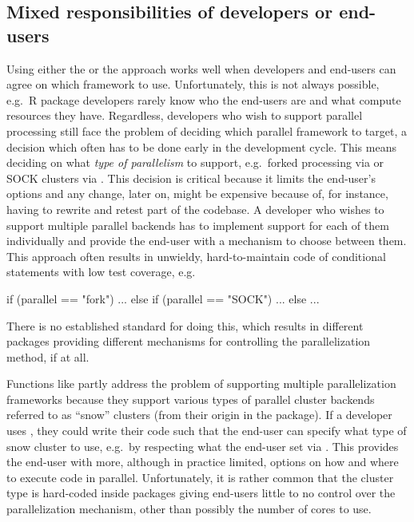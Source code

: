 \subsection{Mixed responsibilities of developers or end-users}
\label{mixed-responsibilities}

Using either the  or the  approach
works well when developers and end-users can agree on which framework
to use. Unfortunately, this is not always possible, e.g.\ R package
developers rarely know who the end-users are and what compute
resources they have. Regardless, developers who wish to support
parallel processing still face the problem of deciding which parallel
framework to target, a decision which often has to be done early in
the development cycle. This means deciding on what \emph{type of
parallelism} to support, e.g.\ forked processing via 
or SOCK clusters via . This decision is critical
because it limits the end-user's options and any change, later on,
might be expensive because of, for instance, having to rewrite and
retest part of the codebase. A developer who wishes to support
multiple parallel backends has to implement support for each of them
individually and provide the end-user with a mechanism to choose
between them. This approach often results in unwieldy,
hard-to-maintain code of conditional statements with low test
coverage, e.g.
\begin{example}
if (parallel == "fork") {
  ...
} else if (parallel == "SOCK") {
  ...
} else {
  ...
}
\end{example}
There is no established standard for doing this, which results in
different packages providing different mechanisms for controlling the
parallelization method, if at all.

Functions like  partly address the problem of
supporting multiple parallelization frameworks because they support
various types of parallel cluster backends referred to as ``snow''
clusters (from their origin in the  package). If a developer
uses , they could write their code such that the
end-user can specify what type of snow cluster to use, e.g.\ by
respecting what the end-user set via .  This
provides the end-user with more, although in practice limited, options
on how and where to execute code in parallel. Unfortunately, it is
rather common that the cluster type is hard-coded inside packages
giving end-users little to no control over the parallelization
mechanism, other than possibly the number of cores to use.

